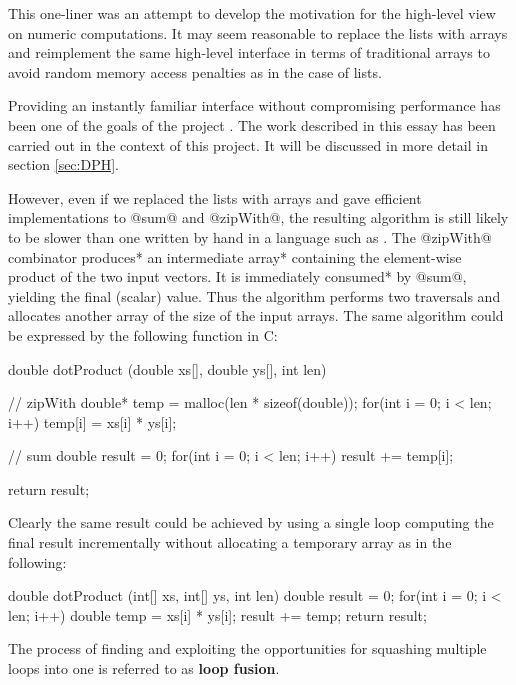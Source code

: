 \documentclass[preamble.tex]{subfiles}
\begin{document}
This one-liner was an attempt to develop the motivation for the high-level view on numeric computations. It may seem reasonable to replace the lists with arrays and reimplement the same high-level interface in terms of traditional arrays to avoid random memory access penalties as in the case of lists.

Providing an instantly familiar interface without compromising performance has been one of the goals of the \idph{} project \cite{PLKC08,CLP+07}. The work described in this essay has been carried out in the context of this project. It will be discussed in more detail in section \ref{sec:DPH}.

However, even if we replaced the lists with arrays and gave efficient implementations to @sum@ and @zipWith@, the resulting algorithm is still likely to be slower than one written by hand in a language such as \C. The @zipWith@ combinator \*produces* an \*intermediate array*\iintermediate{} containing the element-wise product of the two input vectors. It is immediately \*consumed* by @sum@, yielding the final (scalar) value. Thus the algorithm performs two traversals and allocates another array of the size of the input arrays. The same algorithm could be expressed by the following function in C:


\begin{ccode}
double dotProduct (double xs[], double ys[], int len) {
	// zipWith
	double* temp = malloc(len * sizeof(double));
	for(int i = 0; i < len; i++)
		temp[i] = xs[i] * ys[i];

	// sum
	double result = 0;
	for(int i = 0; i < len; i++)
		result += temp[i];

	return result;
}
\end{ccode}


Clearly the same result could be achieved by using a single loop computing the final result incrementally without allocating a temporary array as in the following:


\begin{ccode}
double dotProduct (int[] xs, int[] ys, int len) {
	double result = 0;
	for(int i = 0; i < len; i++)
	    double temp = xs[i] * ys[i];
		result += temp;
	return result;
}
\end{ccode}


\begin{bluebox}
The process of finding and exploiting the opportunities for squashing multiple loops into one is referred to as \textbf{loop fusion}\ifusion{}.
\end{bluebox}
\end{document}
